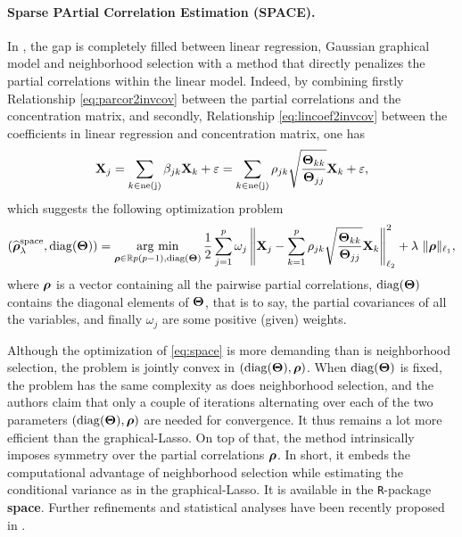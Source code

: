 \paragraph*{Sparse PArtial Correlation Estimation (SPACE).}
In \cite{2009_JASA_Peng}, the gap  is completely filled between linear
regression, Gaussian graphical model and neighborhood selection with a
method  that directly  penalizes the  partial correlations  within the
linear   model.     Indeed,   by   combining    firstly   Relationship
\ref{eq:parcor2invcov}  between  the   partial  correlations  and  the
concentration       matrix,      and       secondly,      Relationship
\ref{eq:lincoef2invcov} between the  coefficients in linear regression
and concentration matrix, one has
\begin{equation*}
  \mathbf{X}_j = \sum_{k \in \text{ne(j)}} \beta_{jk} \mathbf{X}_k + \varepsilon = \sum_{k \in
    \text{ne(j)}} \rho_{jk} \sqrt{\frac{\boldsymbol\Theta_{kk}}{\boldsymbol\Theta_{jj}}} \mathbf{X}_{k} + \varepsilon,
\end{equation*}
which suggests the following optimization problem
\begin{equation}
  \label{eq:space}
  \left(\widehat{\boldsymbol\rho}_\lambda^{\text{space}}, \mathrm{diag}(\boldsymbol\Theta)\right) =
  \mathop{\mathrm{arg\ min}}_{\boldsymbol\rho\in\mathbb{R}{p(p-1)},\mathrm{diag}(\boldsymbol\Theta)} \frac{1}{2}
  \sum_{j=1}^p \omega_j \left\|
    \mathbf{X}_j - \sum_{k=1}^p \rho_{jk} \sqrt{\frac{\boldsymbol\Theta_{kk}}{\boldsymbol\Theta_{jj}}}
    \mathbf{X}_k \right\|_{\ell_2}^2 + \lambda\ \| \boldsymbol\rho \|_{\ell_1},
\end{equation}
where  $\boldsymbol\rho$  is  a  vector  containing  all  the  pairwise  partial
correlations,  $\mathrm{diag}(\boldsymbol\Theta)$  contains  the  diagonal  elements  of
$\boldsymbol\Theta$,  that  is  to  say,  the partial  covariances  of  all  the
variables, and finally $\omega_j$ are some positive (given) weights.

Although the  optimization of \eqref{eq:space} is  more demanding than
is  neighborhood   selection,  the   problem  is  jointly   convex  in
$(\mathrm{diag}(\boldsymbol\Theta),\boldsymbol\rho)$. When $\mathrm{diag}(\boldsymbol\Theta)$  is fixed, the problem
has  the  same complexity  as  does  neighborhood selection,  and  the
authors claim that  only a couple of iterations  alternating over each
of  the   two  parameters  $(\mathrm{diag}(\boldsymbol\Theta),\boldsymbol\rho)$  are   needed  for
convergence.   It  thus   remains  a  lot  more   efficient  than  the
graphical-Lasso.   On top  of that,  the method  intrinsically imposes
symmetry over the  partial correlations $\boldsymbol\rho$.  In  short, it embeds
the computational advantage of neighborhood selection while estimating
the conditional variance  as in the graphical-Lasso.   It is available
in  the \texttt{R}-package  \textbf{space}.   Further refinements  and
statistical    analyses    have     been    recently    proposed    in
\cite{khare2014convex}.


